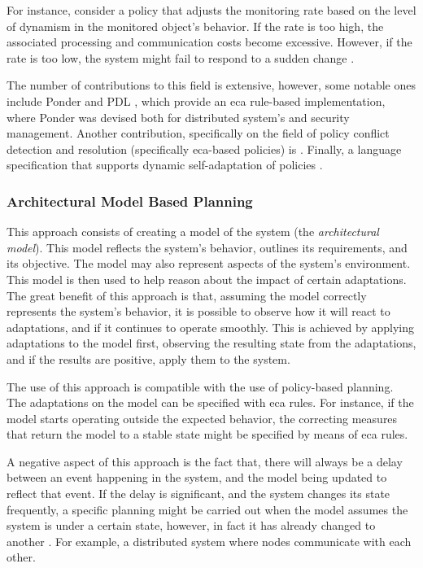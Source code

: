For instance, consider a policy that adjusts the monitoring rate based on the level of dynamism in the monitored object's behavior. If the rate is too high, the associated processing and communication costs become excessive. However, if the rate is too low, the system might fail to respond to a sudden change \cite{Anthony2006}.

The number of contributions to this field is extensive, however, some notable ones include Ponder \cite{Damianou2001} and PDL \cite{Lobo1999}, which provide an \gls{eca} rule-based implementation, where Ponder was devised both for distributed system's and security management. Another contribution, specifically on the field of policy conflict detection and resolution (specifically \gls{eca}-based policies) is \cite{Chomicki2001}. Finally, a language specification that supports dynamic self-adaptation of policies \cite{Anthony2006}.
%
%
%
\subsubsection{Architectural Model Based Planning}
\label{ssec:architectural_model}

This approach consists of creating a model of the system (the \textit{architectural model}). This model reflects the system's behavior, outlines its requirements, and its objective. The model may also represent aspects of the system's environment. This model is then used to help reason about the impact of certain adaptations. The great benefit of this approach is that, assuming the model correctly represents the system's behavior, it is possible to observe how it will react to adaptations, and if it continues to operate smoothly. This is achieved by applying adaptations to the model first, observing the resulting state from the adaptations, and if the results are positive, apply them to the system.

The use of this approach is compatible with the use of policy-based planning. The adaptations on the model can be specified with \gls{eca} rules. For instance, if the model starts operating outside the expected behavior, the correcting measures that return the model to a stable state might be specified by means of \gls{eca} rules.

A negative aspect of this approach is the fact that, there will always be a delay between an event happening in the system, and the model being updated to reflect that event. If the delay is significant, and the system changes its state frequently, a specific planning might be carried out when the model assumes the system is under a certain state, however, in fact it has already changed to another \cite{Huebscher2008}. For example, a distributed system where nodes communicate with each other.
